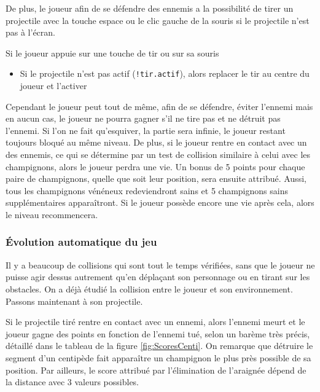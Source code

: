 De plus, le joueur afin de se défendre des ennemis a la possibilité de tirer un projectile avec la touche espace ou le clic gauche de la souris si le projectile n'est pas à l'écran.
\begin{algoinfo}
	\item Si le joueur appuie sur une touche de tir ou sur sa souris
	\begin{itemize}
		\item Si le projectile n'est pas actif (\texttt{!tir.actif}), alors replacer le tir au centre du joueur et l'activer
	\end{itemize}
\end{algoinfo}


Cependant le joueur peut tout de même, afin de se défendre, éviter l'ennemi mais en aucun cas, le joueur ne pourra gagner s'il ne tire pas et ne détruit pas l'ennemi. Si l'on ne fait qu'esquiver, la partie sera infinie, le joueur restant toujours bloqué au même niveau. De plus, si le joueur rentre en contact avec un des ennemis, ce qui se détermine par un test de collision similaire à celui avec les champignons, alors le joueur perdra une vie. Un bonus de 5 points pour chaque paire de champignons, quelle que soit leur position, sera ensuite attribué. Aussi, tous les champignons vénéneux redeviendront sains et 5 champignons sains supplémentaires apparaîtront. Si le joueur possède encore une vie après cela, alors le niveau recommencera. 

\subsubsection{Évolution automatique du jeu}

Il y a beaucoup de collisions qui sont tout le temps vérifiées, sans que le joueur ne puisse agir dessus autrement qu'en déplaçant son personnage ou en tirant sur les obstacles. On a déjà étudié la collision entre le joueur et son environnement. Passons maintenant à son projectile.

Si le projectile tiré rentre en contact avec un ennemi, alors l'ennemi meurt et le joueur gagne des points en fonction de l'ennemi tué, selon un barème très précis, détaillé dans le tableau de la figure \ref{fig:ScoresCenti}. On remarque que détruire le segment d'un centipède fait apparaître un champignon le plus près possible de sa position. Par ailleurs, le score attribué par l'élimination de l'araignée dépend de la distance avec 3 valeurs possibles.

